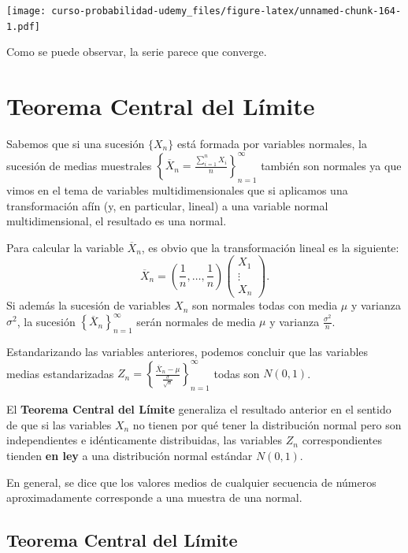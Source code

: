 \documentclass[]{book}
\begin{document}
\texttt{[image: curso-probabilidad-udemy\_files/figure-latex/unnamed-chunk-164-1.pdf]}

Como se puede observar, la serie parece que converge.

\hypertarget{teorema-central-del-luxedmite}{%
\section{Teorema Central del Límite}\label{teorema-central-del-luxedmite}}

Sabemos que si una sucesión \(\{X_n\}\) está formada por variables normales, la sucesión de medias muestrales \(\left\{\overline{X}_n=\frac{\sum\limits_{i=1}^n X_i}{n}\right\}_{n=1}^\infty\) también son normales ya que vimos en el tema de variables multidimensionales que si aplicamos una transformación afín (y, en particular, lineal) a una variable normal multidimensional, el resultado es una normal.

Para calcular la variable \(\overline{X}_n\), es obvio que la transformación lineal es la siguiente:
\[
\overline{X}_n = \left(\frac{1}{n},\ldots,\frac{1}{n}\right)\begin{pmatrix}X_1 \\\vdots\\ X_n\end{pmatrix}.
\]
Si además la sucesión de variables \(X_n\) son normales todas con media \(\mu\) y varianza \(\sigma^2\), la sucesión \(\left\{\overline{X}_n\right\}_{n=1}^\infty\) serán normales de media \(\mu\) y varianza \(\frac{\sigma^2}{n}\).

Estandarizando las variables anteriores, podemos concluir que las variables medias estandarizadas \(Z_n =\left\{\frac{\overline{X}_n-\mu}{\frac{\sigma}{\sqrt{n}}}\right\}_{n=1}^\infty\) todas son \(N(0,1)\).

El \textbf{Teorema Central del Límite} generaliza el resultado anterior en el sentido de que si las variables \(X_n\) no tienen por qué tener la distribución normal pero son independientes e idénticamente distribuidas, las variables \(Z_n\) correspondientes tienden \textbf{en ley} a una distribución normal estándar \(N(0,1)\).

En general, se dice que los valores medios de cualquier secuencia de números aproximadamente corresponde a una muestra de una normal.

\hypertarget{teorema-central-del-luxedmite-1}{%
\subsection{Teorema Central del Límite}\label{teorema-central-del-luxedmite-1}}
\end{document}
